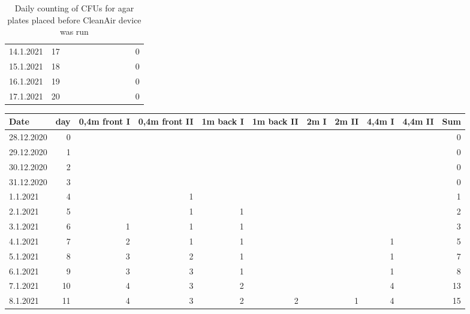 \documentclass[hyperref]{labbook}
\begin{document}
\begin{table}[H]
\begin{tabular}{|l r | rrrrrrrrr|}
14.1.2021 &17 &            &             &           &            &    &     &      &       &0  \\
15.1.2021 &18 &            &             &           &            &    &     &      &       &0  \\
16.1.2021 &19 &            &             &           &            &    &     &      &       &0  \\
17.1.2021 &20 &            &             &           &            &    &     &      &       &0  \\\hline
\end{tabular}
\caption{Daily counting of CFUs for agar plates placed before CleanAir device was run}
\end{table}
\begin{table}[H]
\tiny
\begin{tabular}{|l r | rrrrrrrrr|}\hline
Date      &day&0,4m front I&0,4m front II&1m back I&1m back II&2m I&2m II&4,4m I&4,4m II&Sum\\\hline
28.12.2020&0  &            &             &           &            &    &     &      &       &0  \\
29.12.2020&1  &            &             &           &            &    &     &      &       &0  \\
30.12.2020&2  &            &             &           &            &    &     &      &       &0  \\
31.12.2020&3  &            &             &           &            &    &     &      &       &0  \\
1.1.2021  &4  &            &1            &           &            &    &     &      &       &1  \\
2.1.2021  &5  &            &1            &1          &            &    &     &      &       &2  \\
3.1.2021  &6  &1           &1            &1          &            &    &     &      &       &3  \\
4.1.2021  &7  &2           &1            &1          &            &    &     &1     &       &5  \\
5.1.2021  &8  &3           &2            &1          &            &    &     &1     &       &7  \\
6.1.2021  &9  &3           &3            &1          &            &    &     &1     &       &8  \\
7.1.2021  &10 &4           &3            &2          &            &    &     &4     &       &13 \\
8.1.2021  &11 &4           &3            &2          &2           &    &1    &4     &       &15 \\

\end{tabular}
\end{table}
\end{document}
